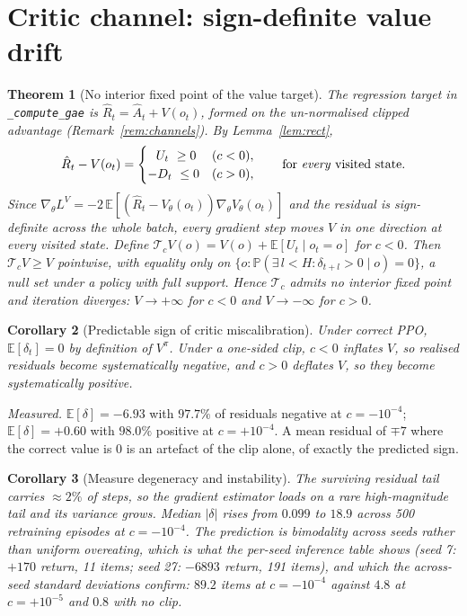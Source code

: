 \documentclass[11pt]{article}
\newtheorem{theorem}{Theorem}
\newtheorem{corollary}[theorem]{Corollary}
\theoremstyle{definition}
\newcommand{\Ahat}{\hat A}
\newcommand{\Rhat}{\hat R}
\newcommand{\E}{\mathbb{E}}
\newcommand{\Prob}{\mathbb{P}}
\begin{document}
\section{Critic channel: sign-definite value drift}
\label{sec:critic}

\begin{theorem}[No interior fixed point of the value target]
\label{thm:critic}
The regression target in \texttt{\_compute\_gae} is $\Rhat_t=\Ahat_t+V(o_t)$,
formed on the un-normalised clipped advantage (Remark~\ref{rem:channels}). By
Lemma~\ref{lem:rect},
\begin{equation}
\Rhat_t-V(o_t)=
\begin{cases}
\ \ U_t\ \ge0 & (c<0),\\
-D_t\ \le0 & (c>0),
\end{cases}
\qquad\text{for \emph{every} visited state.}
\label{eq:residsign}
\end{equation}
Since $\nabla_\theta L^V=-2\,\E\!\left[(\Rhat_t-V_\theta(o_t))\nabla_\theta V_\theta(o_t)\right]$
and the residual is sign-definite across the whole batch, every gradient step
moves $V$ in one direction at every visited state. Define
$\mathcal{T}_cV(o)=V(o)+\E[U_t\mid o_t=o]$ for $c<0$. Then
$\mathcal{T}_cV\ge V$ pointwise, with equality only on
$\{o:\Prob(\exists\,l<H:\delta_{t+l}>0\mid o)=0\}$, a null set under a policy
with full support. Hence $\mathcal{T}_c$ admits no interior fixed point and
iteration diverges: $V\to+\infty$ for $c<0$ and $V\to-\infty$ for $c>0$.
\end{theorem}

\begin{corollary}[Predictable sign of critic miscalibration]
\label{cor:miscal}
Under correct PPO, $\E[\delta_t]=0$ by definition of $V^\pi$. Under a
one-sided clip, $c<0$ inflates $V$, so realised residuals become
systematically negative, and $c>0$ deflates $V$, so they become systematically
positive.
\end{corollary}

\noindent
\emph{Measured.} $\E[\delta]=-6.93$ with $97.7\%$ of residuals negative at
$c=-10^{-4}$; $\E[\delta]=+0.60$ with $98.0\%$ positive at $c=+10^{-4}$. A
mean residual of $\mp7$ where the correct value is $0$ is an artefact of the
clip alone, of exactly the predicted sign.

\begin{corollary}[Measure degeneracy and instability]
\label{cor:degen}
The surviving residual tail carries $\approx2\%$ of steps, so the gradient
estimator loads on a rare high-magnitude tail and its variance grows. Median
$|\delta|$ rises from $0.099$ to $18.9$ across 500 retraining episodes at
$c=-10^{-4}$. The prediction is bimodality across seeds rather than uniform
overeating, which is what the per-seed inference table shows (seed 7:
$+170$ return, 11 items; seed 27: $-6893$ return, 191 items), and which the
across-seed standard deviations confirm: $89.2$ items at $c=-10^{-4}$ against
$4.8$ at $c=+10^{-5}$ and $0.8$ with no clip.
\end{corollary}
\end{document}
